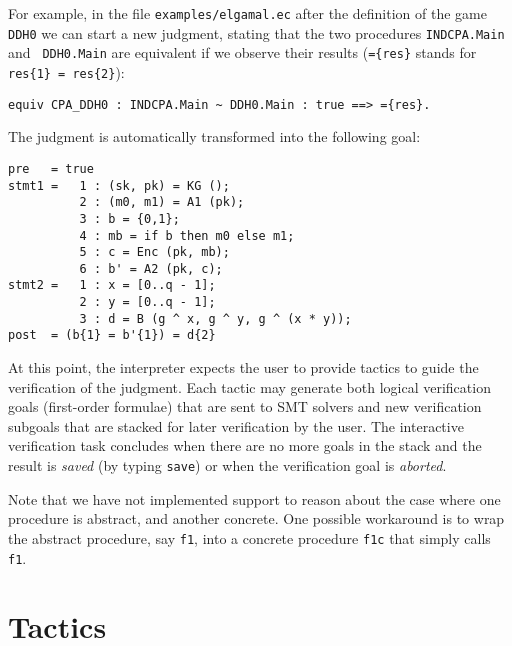 For example, in the file \verb+examples/elgamal.ec+ after the
definition of the game \verb+DDH0+ we can start a new judgment,
stating that the two procedures \verb!INDCPA.Main! and
\verb! DDH0.Main! are equivalent if we observe their results
(\verb+={res}+ stands for \verb+res{1} = res{2}+):
\begin{verbatim}
equiv CPA_DDH0 : INDCPA.Main ~ DDH0.Main : true ==> ={res}.
\end{verbatim}
The judgment is automatically transformed into the following goal:
\begin{verbatim}
pre   = true
stmt1 =   1 : (sk, pk) = KG ();
          2 : (m0, m1) = A1 (pk);
          3 : b = {0,1};
          4 : mb = if b then m0 else m1;
          5 : c = Enc (pk, mb);
          6 : b' = A2 (pk, c);
stmt2 =   1 : x = [0..q - 1];
          2 : y = [0..q - 1];
          3 : d = B (g ^ x, g ^ y, g ^ (x * y));
post  = (b{1} = b'{1}) = d{2}
\end{verbatim}
At this point, the \EasyCrypt interpreter expects the user to provide
tactics to guide the verification of the judgment. Each tactic may
generate both logical verification goals (first-order formulae) that
are sent to SMT solvers and new verification subgoals that are stacked
for later verification by the user. The interactive verification task
concludes when there are no more goals in the stack and the result is
\emph{saved} (by typing \verb|save|) or when the verification goal is
\emph{aborted}.
%


Note that we have not implemented support to reason about the case
where one procedure is abstract, and another concrete. One possible
workaround is to wrap the abstract procedure, say \verb!f1!, into
a concrete procedure \verb!f1c! that simply calls \verb!f1!.  



 




\section{Tactics}


